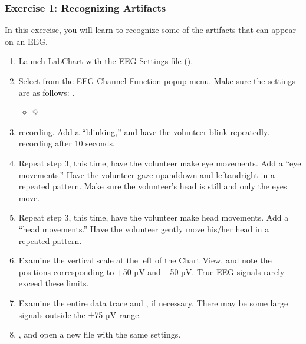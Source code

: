 \documentclass[letterpaper,10pt,english]{jupyterBook}
\begin{document}
\subsubsection{Exercise 1: Recognizing Artifacts}
\label{\detokenize{EEG:exercise-1-recognizing-artifacts}}
\sphinxAtStartPar
In this exercise, you will learn to recognize some of the artifacts that can appear on an EEG.
\begin{enumerate}
%
\item {} 
\sphinxAtStartPar
Launch LabChart with the EEG Settings file ().

\item {} 
\sphinxAtStartPar
Select  from the EEG Channel Function pop\sphinxhyphen{}up menu. Make sure the settings are as follows: .
\begin{itemize}
\item {} 
\sphinxAtStartPar
💡 

\end{itemize}

\item {} 
\sphinxAtStartPar
{} recording. Add a  “blinking,” and have the volunteer blink repeatedly.  recording after 10 seconds.

\item {} 
\sphinxAtStartPar
Repeat step 3, this time, have the volunteer make eye movements. Add a  “eye movements.” Have the volunteer gaze up\sphinxhyphen{}and\sphinxhyphen{}down and left\sphinxhyphen{}and\sphinxhyphen{}right in a repeated pattern. Make sure the volunteer’s head is still and only the eyes move.

\item {} 
\sphinxAtStartPar
Repeat step 3, this time, have the volunteer make head movements. Add a  “head movements.” Have the volunteer gently move his/her head in a repeated pattern.

\item {} 
\sphinxAtStartPar
Examine the vertical scale at the left of the Chart View, and note the positions corresponding to +50 µV and −50 µV. True EEG signals rarely exceed these limits.

\item {} 
\sphinxAtStartPar
Examine the entire data trace and , if necessary. There may be some large signals outside the ±75 µV range. 

\item {} 
\sphinxAtStartPar
{}, and open a new file with the same settings.

\end{enumerate}
\end{document}

